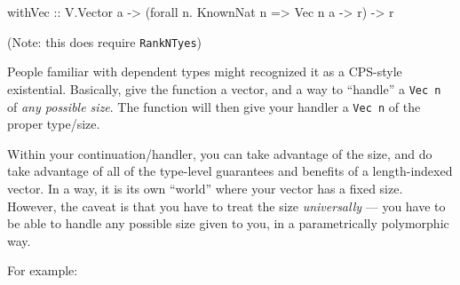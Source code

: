 \documentclass[]{article}
\newenvironment{Shaded}{}{}
\newcommand{\KeywordTok}[1]{\textcolor[rgb]{0.00,0.44,0.13}{\textbf{#1}}}
\newcommand{\DataTypeTok}[1]{\textcolor[rgb]{0.56,0.13,0.00}{#1}}
\newcommand{\DecValTok}[1]{\textcolor[rgb]{0.25,0.63,0.44}{#1}}
\newcommand{\CommentTok}[1]{\textcolor[rgb]{0.38,0.63,0.69}{\textit{#1}}}
\newcommand{\OtherTok}[1]{\textcolor[rgb]{0.00,0.44,0.13}{#1}}
\newcommand{\FunctionTok}[1]{\textcolor[rgb]{0.02,0.16,0.49}{#1}}
\newcommand{\NormalTok}[1]{#1}
\begin{document}
\begin{Shaded}
\begin{Highlighting}[]
\NormalTok{withVec}
\OtherTok{    ::} \DataTypeTok{V.Vector}\NormalTok{ a}
    \OtherTok{->}\NormalTok{ (forall n}\FunctionTok{.} \DataTypeTok{KnownNat}\NormalTok{ n }\OtherTok{=>} \DataTypeTok{Vec}\NormalTok{ n a }\OtherTok{->}\NormalTok{ r)}
    \OtherTok{->}\NormalTok{ r}
\end{Highlighting}
\end{Shaded}

(Note: this does require \texttt{RankNTyes})

People familiar with dependent types might recognized it as a CPS-style
existential. Basically, give the function a vector, and a way to ``handle'' a
\texttt{Vec\ n} of \emph{any possible size}. The function will then give your
handler a \texttt{Vec\ n} of the proper type/size.

Within your continuation/handler, you can take advantage of the size, and do
take advantage of all of the type-level guarantees and benefits of a
length-indexed vector. In a way, it is its own ``world'' where your vector has a
fixed size. However, the caveat is that you have to treat the size
\emph{universally} --- you have to be able to handle any possible size given to
you, in a parametrically polymorphic way.

For example:

\begin{Shaded}
\end{Shaded}
\end{document}
